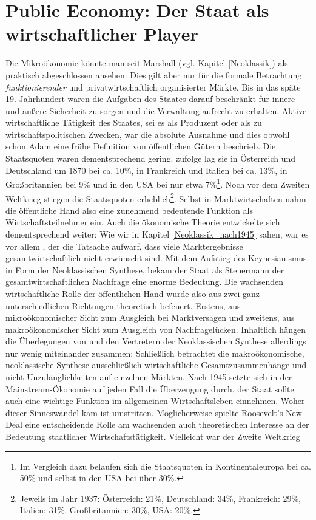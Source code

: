 %
%
%

\chapter{Public Economy: Der Staat als wirtschaftlicher Player}
\label{cha: Marktversagen}

Die Mikroökonomie könnte man seit Marshall (vgl. Kapitel \ref{Neoklassik}) als praktisch abgeschlossen ansehen. Dies gilt aber nur für die formale Betrachtung \textit{funktionierender} und privatwirtschaftlich organisierter Märkte. Bis in das späte 19. Jahrhundert waren die Aufgaben des Staates darauf beschränkt für innere und äußere Sicherheit zu sorgen und die Verwaltung aufrecht zu erhalten. Aktive wirtschaftliche Tätigkeit des Staates, sei es als Produzent oder als zu wirtschaftspolitischen Zwecken, war die absolute Ausnahme und dies obwohl schon Adam \textcite{Smith1776} eine frühe Definition von öffentlichen Gütern beschrieb. Die Staatsquoten waren dementsprechend gering. \textcite[S. 6]{Tanzi2000} zufolge lag sie in Österreich und Deutschland um 1870 bei ca. 10\%, in Frankreich und Italien bei ca. 13\%, in Großbritannien bei 9\% und in den USA bei nur etwa 7\%\footnote{Im Vergleich dazu belaufen sich die Staatsquoten in Kontinentaleuropa bei ca. 50\% und selbst in den USA bei über 30\%.}. Noch vor dem Zweiten Weltkrieg stiegen die Staatsquoten erheblich\footnote{Jeweils im Jahr 1937: Österreich: 21\%, Deutschland: 34\%, Frankreich: 29\%, Italien: 31\%, Großbritannien: 30\%, USA: 20\%.}. Selbst in Marktwirtschaften nahm die öffentliche Hand also eine zunehmend bedeutende Funktion als Wirtschaftsteilnehmer ein. Auch die ökonomische Theorie entwickelte sich dementsprechend weiter: Wie wir in Kapitel \ref{Neoklassik_nach1945} sahen, war es vor allem \textcite{Pigou1920}, der die Tatsache aufwarf, dass viele Marktergebnisse gesamtwirtschaftlich nicht erwünscht sind. Mit dem Aufstieg des Keynesianismus in Form der Neoklassischen Synthese, bekam der Staat als Steuermann der gesamtwirtschaftlichen Nachfrage eine enorme Bedeutung. Die wachsenden wirtschaftliche Rolle der öffentlichen Hand wurde also aus zwei ganz unterschiedlichen Richtungen theoretisch befeuert. Erstens, aus mikroökonomischer Sicht zum Ausgleich bei Marktversagen und zweitens, aus makroökonomischer Sicht zum Ausgleich von Nachfragelücken. Inhaltlich hängen die Überlegungen von \textcite{Pigou1920} und den Vertretern der Neoklassischen Synthese allerdings nur wenig miteinander zusammen: Schließlich betrachtet die makroökonomische, neoklassische Synthese ausschließlich wirtschaftliche Gesamtzusammenhänge und nicht Unzulänglichkeiten auf einzelnen Märkten. Nach 1945 setzte sich in der Mainstream-Ökonomie auf jeden Fall die Überzeugung durch, der Staat sollte auch eine wichtige Funktion im allgemeinen Wirtschaftsleben einnehmen. Woher dieser Sinneswandel kam ist umstritten. Möglicherweise spielte Roosevelt's New Deal eine entscheidende Rolle am wachsenden auch theoretischen Interesse an der Bedeutung staatlicher Wirtschaftstätigkeit. Vielleicht war der Zweite Weltkrieg 